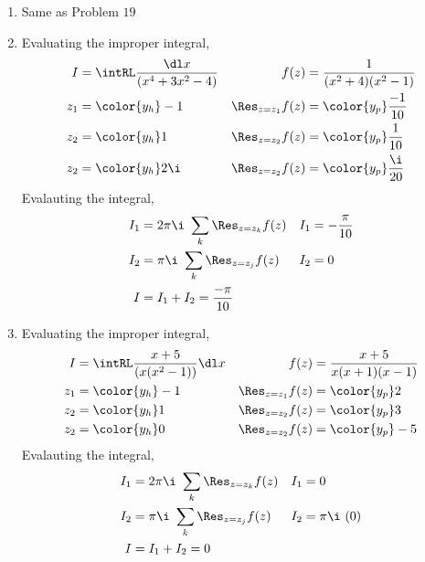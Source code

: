 \begin{enumerate}
    \item Same as Problem $ 19 $

    \item Evaluating the improper integral,
          \begin{align}
              I                   & = \intRL \frac{\dl x}{(x^4 + 3x^2 - 4)} &
              f(z)                & = \frac{1}{(x^2 + 4)(x^2 - 1)}            \\
              z_1                 & = \color{y_h} -1                        &
              \Res_{z = z_1} f(z) & = \color{y_p} \frac{-1}{10}               \\
              z_2                 & = \color{y_h} 1                         &
              \Res_{z = z_2} f(z) & = \color{y_p} \frac{1}{10}                \\
              z_2                 & = \color{y_h} 2\i                       &
              \Res_{z = z_2} f(z) & = \color{y_p} \frac{\i}{20}
          \end{align}
          Evalauting the integral,
          \begin{align}
              I_1 & = 2\pi\i\ \sum_{k} \Res_{z = z_k} f(z) &
              I_1 & = -\frac{\pi}{10}                        \\
              I_2 & = \pi\i\ \sum_{k} \Res_{z = z_j} f(z)  &
              I_2 & = 0                                      \\
              I   & = I_1 + I_2 = \frac{-\pi}{10}
          \end{align}

    \item Evaluating the improper integral,
          \begin{align}
              I                   & = \intRL \frac{x + 5}{(x(x^2 - 1))} \dl x &
              f(z)                & = \frac{x+5}{x(x + 1)(x - 1)}               \\
              z_1                 & = \color{y_h} -1                          &
              \Res_{z = z_1} f(z) & = \color{y_p} 2                             \\
              z_2                 & = \color{y_h} 1                           &
              \Res_{z = z_2} f(z) & = \color{y_p} 3                             \\
              z_2                 & = \color{y_h} 0                           &
              \Res_{z = z_2} f(z) & = \color{y_p} -5
          \end{align}
          Evalauting the integral,
          \begin{align}
              I_1 & = 2\pi\i\ \sum_{k} \Res_{z = z_k} f(z) &
              I_1 & = 0                                      \\
              I_2 & = \pi\i\ \sum_{k} \Res_{z = z_j} f(z)  &
              I_2 & = \pi\i\ (0)                             \\
              I   & = I_1 + I_2 = 0
          \end{align}


\end{enumerate}
